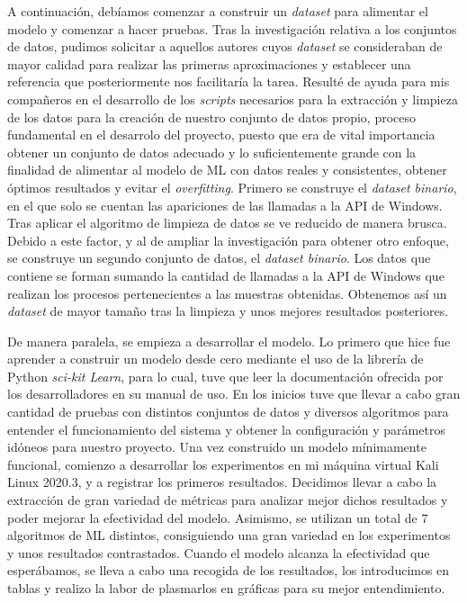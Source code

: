 A continuación, debíamos comenzar a construir un \textit{dataset} para alimentar el modelo y comenzar a hacer pruebas. Tras la investigación relativa a los conjuntos de datos, pudimos solicitar a aquellos autores cuyos \textit{dataset} se consideraban de mayor calidad para realizar las primeras aproximaciones y establecer una referencia que posteriormente nos facilitaría la tarea. Resulté de ayuda para mis compañeros en el desarrollo de los \textit{scripts} necesarios para la extracción y limpieza de los datos para la creación de nuestro conjunto de datos propio, proceso fundamental en el desarrolo del proyecto, puesto que era de vital importancia obtener un conjunto de datos adecuado y lo suficientemente grande con la finalidad de alimentar al modelo de \gls{ML} con datos reales y consistentes, obtener óptimos resultados y evitar el \textit{overfitting}. Primero se construye el \textit{dataset binario}, en el que solo se cuentan las apariciones de las llamadas a la \gls{API} de Windows. Tras aplicar el algoritmo de limpieza de datos se ve reducido de manera brusca. Debido a este factor, y al de ampliar la investigación para obtener otro enfoque, se construye un segundo conjunto de datos, el \textit{dataset binario}. Los datos que contiene se forman sumando la cantidad de llamadas a la \gls{API} de Windows que realizan los procesos pertenecientes a las muestras obtenidas. Obtenemos así un \textit{dataset} de mayor tamaño tras la limpieza y unos mejores resultados posteriores.

De manera paralela, se empieza a desarrollar el modelo. Lo primero que hice fue aprender a construir un modelo desde cero mediante el uso de la librería de Python \textit{sci-kit Learn}, para lo cual, tuve que leer la documentación ofrecida por los desarrolladores en su manual de uso. En los inicios tuve que llevar a cabo gran cantidad de pruebas con distintos conjuntos de datos y diversos algoritmos para entender el funcionamiento del sistema y obtener la configuración y parámetros idóneos para nuestro proyecto. Una vez construido un modelo mínimamente funcional, comienzo a desarrollar los experimentos en mi máquina virtual Kali Linux 2020.3, y a registrar los primeros resultados. Decidimos llevar a cabo la extracción de gran variedad de métricas para analizar mejor dichos resultados y poder mejorar la efectividad del modelo. Asimismo, se utilizan un total de 7 algoritmos de \gls{ML} distintos, consiguiendo una gran variedad en los experimentos y unos resultados contrastados. Cuando el modelo alcanza la efectividad que esperábamos, se lleva a cabo una recogida de los resultados, los introducimos en tablas y realizo la labor de plasmarlos en gráficas para su mejor entendimiento.  

